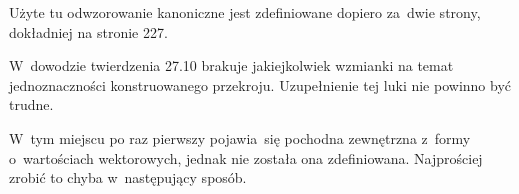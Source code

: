 \documentclass[a4paper,11pt]{article}
\begin{document}
\start {} Użyte tu odwzorowanie kanoniczne jest zdefiniowane
dopiero za~dwie strony, dokładniej na stronie 227.

\vspace{\spaceFour}



\start {} W~dowodzie twierdzenia 27.10 brakuje jakiejkolwiek
wzmianki na temat jednoznaczności konstruowanego przekroju.
Uzupełnienie tej luki nie powinno być trudne.

\vspace{\spaceFour}


\start {} W~tym miejscu po raz pierwszy pojawia~się pochodna
zewnętrzna z~formy o~wartościach wektorowych, jednak nie została ona
zdefiniowana. Najprościej zrobić to chyba w~następujący sposób.





\newpage
{}
\end{document}
